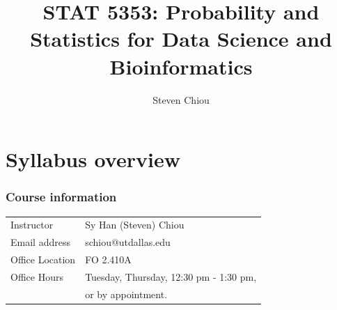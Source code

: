 \documentclass{beamer}
\title[STAT 5353.001]{STAT 5353: Probability and Statistics for Data Science and Bioinformatics}
\author[Steven Chiou]{Steven Chiou}
\institute[UTD]{Department of Mathematical Sciences, \\ University of Texas at Dallas}
\date{}
\begin{document}
\begin{frame}
  \titlepage
\end{frame}

\bgroup
{}




\section{Syllabus overview}
\begin{frame}
\frametitle{Course information}
\begin{center}
\begin{tabular}{p{} p{}}
Instructor & Sy Han (Steven) Chiou\\
Email address & schiou@utdallas.edu\\
Office Location & FO 2.410A\\
Office Hours & Tuesday, Thursday, 12:30 pm - 1:30 pm, \\
&or by appointment.
\end{tabular}
\end{center}
\end{frame}
\end{document}
